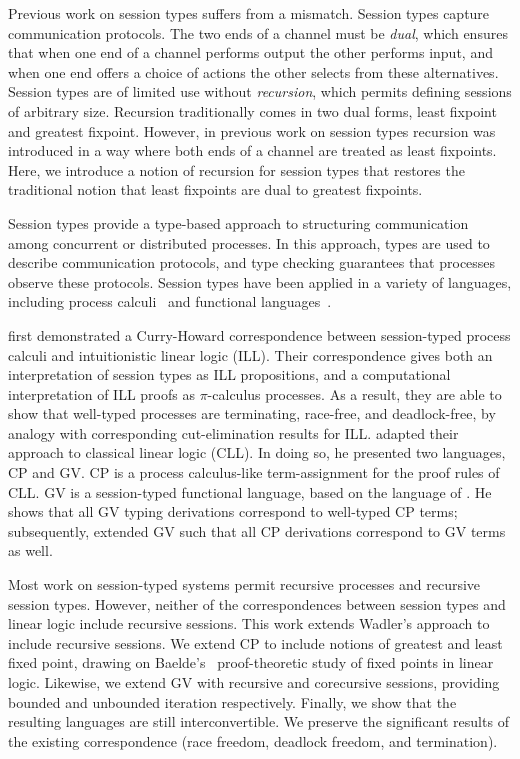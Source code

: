 \documentclass[orivec,envcountsame]{llncs}
\begin{document}
Previous work on session types suffers from a mismatch.  Session types capture communication
protocols.  The two ends of a channel must be \emph{dual}, which ensures that when one end of a
channel performs output the other performs input, and when one end offers a choice of actions the
other selects from these alternatives.  Session types are of limited use without \emph{recursion},
which permits defining sessions of arbitrary size.  Recursion traditionally comes in two dual forms,
least fixpoint and greatest fixpoint.  However, in previous work on session types recursion was
introduced in a way where both ends of a channel are treated as least fixpoints.  Here, we introduce
a notion of recursion for session types that restores the traditional notion that least fixpoints
are dual to greatest fixpoints.



Session types provide a type-based approach to structuring communication among concurrent or
distributed processes.  In this approach, types are used to describe communication protocols, and
type checking guarantees that processes observe these protocols.  Session types have been applied in
a variety of languages, including process calculi~\citep{Honda93,Honda98} and functional
languages~\citep{GayVasconcelos10}.

\citet{CairesPfenning10} first demonstrated a Curry-Howard correspondence between session-typed
process calculi and intuitionistic linear logic (ILL).  Their correspondence gives both an
interpretation of session types as ILL propositions, and a computational interpretation of ILL
proofs as $\pi$-calculus processes.  As a result, they are able to show that well-typed processes
are terminating, race-free, and deadlock-free, by analogy with corresponding cut-elimination results
for ILL.  \citet{Wadler12} adapted their approach to classical linear logic (CLL).  In doing so, he
presented two languages, CP and GV.  CP is a process calculus-like term-assignment for the proof
rules of CLL.  GV is a session-typed functional language, based on the language of
\citet{GayVasconcelos10}.  He shows that all GV typing derivations correspond to well-typed CP
terms; subsequently, \cite{LindleyM14} extended GV such that all CP derivations correspond to GV
terms as well.

Most work on session-typed systems permit recursive processes and recursive session types.  However,
neither of the correspondences between session types and linear logic include recursive sessions.
This work extends Wadler's approach to include recursive sessions.  We extend CP to include notions
of greatest and least fixed point, drawing on Baelde's~\citeyearpar{Baelde12} proof-theoretic study of
fixed points in linear logic.  Likewise, we extend GV with recursive and corecursive sessions,
providing bounded and unbounded iteration respectively.  Finally, we show that the resulting
languages are still interconvertible.  We preserve the significant results of the existing
correspondence (race freedom, deadlock freedom, and termination).
\end{document}
